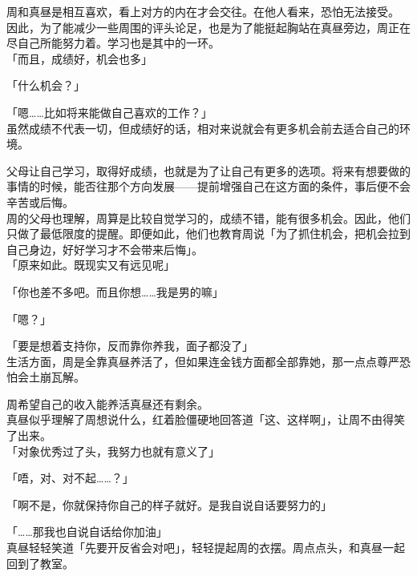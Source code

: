 周和真昼是相互喜欢，看上对方的内在才会交往。在他人看来，恐怕无法接受。\\

因此，为了能减少一些周围的评头论足，也是为了能挺起胸站在真昼旁边，周正在尽自己所能努力着。学习也是其中的一环。\\

「而且，成绩好，机会也多」

「什么机会？」

「嗯……比如将来能做自己喜欢的工作？」\\

虽然成绩不代表一切，但成绩好的话，相对来说就会有更多机会前去适合自己的环境。

父母让自己学习，取得好成绩，也就是为了让自己有更多的选项。将来有想要做的事情的时候，能否往那个方向发展——提前增强自己在这方面的条件，事后便不会辛苦或后悔。\\

周的父母也理解，周算是比较自觉学习的，成绩不错，能有很多机会。因此，他们只做了最低限度的提醒。即便如此，他们也教育周说「为了抓住机会，把机会拉到自己身边，好好学习才不会带来后悔」。\\

「原来如此。既现实又有远见呢」

「你也差不多吧。而且你想……我是男的嘛」

「嗯？」

「要是想着支持你，反而靠你养我，面子都没了」\\

生活方面，周是全靠真昼养活了，但如果连金钱方面都全部靠她，那一点点尊严恐怕会土崩瓦解。

周希望自己的收入能养活真昼还有剩余。\\

真昼似乎理解了周想说什么，红着脸僵硬地回答道「这、这样啊」，让周不由得笑了出来。\\

「对象优秀过了头，我努力也就有意义了」

「唔，对、对不起……？」

「啊不是，你就保持你自己的样子就好。是我自说自话要努力的」

「……那我也自说自话给你加油」\\

真昼轻轻笑道「先要开反省会对吧」，轻轻提起周的衣摆。周点点头，和真昼一起回到了教室。
